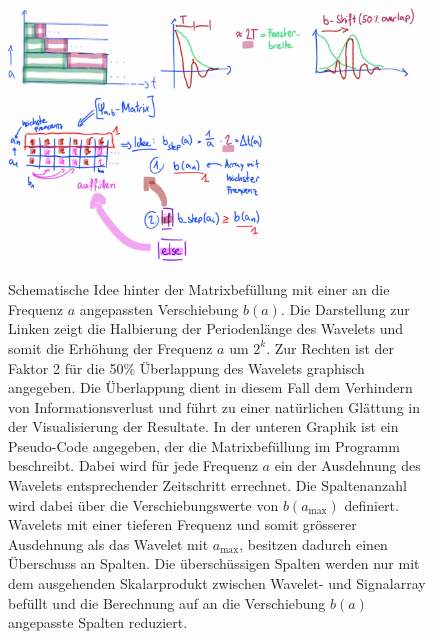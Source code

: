 \begin{figure}
	\centering
	\includegraphics[width=0.35\textwidth]{papers/wavelets/images/16-1_filterbankFillUp_1.png}
	\includegraphics[width=0.6\textwidth]{papers/wavelets/images/16-2_filterbankFillUp_2.png}
	\includegraphics[width=0.6\textwidth]{papers/wavelets/images/16-3_filterbankFillUp_3.png}
	\caption{Schematische Idee hinter der Matrixbefüllung mit
	einer an die Frequenz $a$ angepassten Verschiebung $b(a)$.
	Die Darstellung zur Linken zeigt die Halbierung der
	Periodenlänge des Wavelets und somit die Erhöhung der
	Frequenz $a$ um $2^k$.
	Zur Rechten ist der Faktor 2 für die 50\% Überlappung des
	Wavelets graphisch angegeben.
	Die Überlappung dient in diesem Fall dem Verhindern von
	Informationsverlust und führt zu einer natürlichen Glättung
	in der Visualisierung der Resultate.
	In der unteren Graphik ist ein Pseudo-Code angegeben, der
	die Matrixbefüllung im Programm beschreibt.
	Dabei wird für jede Frequenz $a$ ein der Ausdehnung des
	Wavelets entsprechender Zeitschritt errechnet.
	Die Spaltenanzahl wird dabei über die Verschiebungswerte
	von $b(a_\text{max})$ definiert.
	Wavelets mit einer tieferen Frequenz und somit grösserer
	Ausdehnung als das Wavelet mit $a_\text{max}$, besitzen
	dadurch einen Überschuss an Spalten. Die überschüssigen
	Spalten werden nur mit dem ausgehenden Skalarprodukt zwischen
	Wavelet- und Signalarray befüllt und die Berechnung auf an
	die Verschiebung $b(a)$ angepasste Spalten reduziert.}
	\label{wavelet:fig:filterbankFillUp}
\end{figure}

